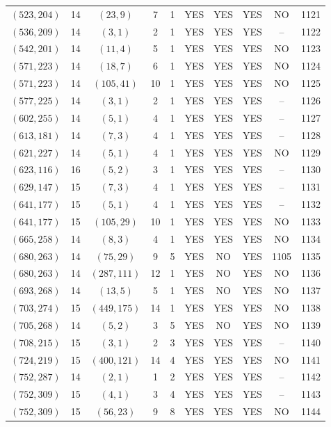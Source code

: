 \begin{longtable}{|c|c|c|c|c|c|c|c|c|c|}
$(523, 204)$ & 14 & $(23, 9)$ & 7 & 1 & YES & YES & YES & NO & 1121\\
$(536, 209)$ & 14 & $(3, 1)$ & 2 & 1 & YES & YES & YES & -- & 1122\\
$(542, 201)$ & 14 & $(11, 4)$ & 5 & 1 & YES & YES & YES & NO & 1123\\
$(571, 223)$ & 14 & $(18, 7)$ & 6 & 1 & YES & YES & YES & NO & 1124\\
$(571, 223)$ & 14 & $(105, 41)$ & 10 & 1 & YES & YES & YES & NO & 1125\\
$(577, 225)$ & 14 & $(3, 1)$ & 2 & 1 & YES & YES & YES & -- & 1126\\
$(602, 255)$ & 14 & $(5, 1)$ & 4 & 1 & YES & YES & YES & -- & 1127\\
$(613, 181)$ & 14 & $(7, 3)$ & 4 & 1 & YES & YES & YES & -- & 1128\\
$(621, 227)$ & 14 & $(5, 1)$ & 4 & 1 & YES & YES & YES & NO & 1129\\
$(623, 116)$ & 16 & $(5, 2)$ & 3 & 1 & YES & YES & YES & -- & 1130\\
$(629, 147)$ & 15 & $(7, 3)$ & 4 & 1 & YES & YES & YES & -- & 1131\\
$(641, 177)$ & 15 & $(5, 1)$ & 4 & 1 & YES & YES & YES & -- & 1132\\
$(641, 177)$ & 15 & $(105, 29)$ & 10 & 1 & YES & YES & YES & NO & 1133\\
$(665, 258)$ & 14 & $(8, 3)$ & 4 & 1 & YES & YES & YES & NO & 1134\\
$(680, 263)$ & 14 & $(75, 29)$ & 9 & 5 & YES & NO & YES & 1105 & 1135\\
$(680, 263)$ & 14 & $(287, 111)$ & 12 & 1 & YES & NO & YES & NO & 1136\\
$(693, 268)$ & 14 & $(13, 5)$ & 5 & 1 & YES & NO & YES & NO & 1137\\
$(703, 274)$ & 15 & $(449, 175)$ & 14 & 1 & YES & YES & YES & NO & 1138\\
$(705, 268)$ & 14 & $(5, 2)$ & 3 & 5 & YES & NO & YES & NO & 1139\\
$(708, 215)$ & 15 & $(3, 1)$ & 2 & 3 & YES & YES & YES & -- & 1140\\
$(724, 219)$ & 15 & $(400, 121)$ & 14 & 4 & YES & YES & YES & NO & 1141\\
$(752, 287)$ & 14 & $(2, 1)$ & 1 & 2 & YES & YES & YES & -- & 1142\\
$(752, 309)$ & 15 & $(4, 1)$ & 3 & 4 & YES & YES & YES & -- & 1143\\
$(752, 309)$ & 15 & $(56, 23)$ & 9 & 8 & YES & YES & YES & NO & 1144\\

\end{longtable}
